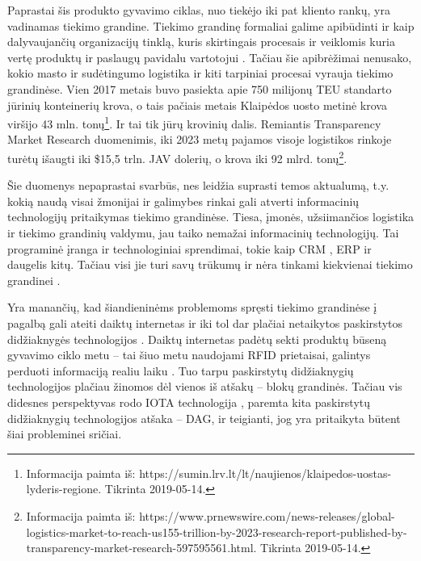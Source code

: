 Paprastai šis produkto gyvavimo ciklas, nuo tiekėjo iki pat kliento rankų, yra vadinamas tiekimo grandine. Tiekimo grandinę formaliai galime apibūdinti ir kaip dalyvaujančių organizacijų tinklą, kuris skirtingais procesais ir veiklomis kuria vertę produktų ir paslaugų pavidalu vartotojui \cite{christopher2016logistics}. Tačiau šie apibrėžimai nenusako, kokio masto ir sudėtingumo logistika ir kiti tarpiniai procesai vyrauja tiekimo grandinėse. Vien 2017 metais buvo pasiekta apie 750 milijonų TEU standarto jūrinių konteinerių krova\footnotemark[\ref{note1}], o tais pačiais metais Klaipėdos uosto metinė krova viršijo 43 mln. tonų\footnote{Informacija paimta iš: https://sumin.lrv.lt/lt/naujienos/klaipedos-uostas-lyderis-regione. Tikrinta 2019-05-14.}. Ir tai tik jūrų krovinių dalis. Remiantis Transparency Market Research duomenimis, iki 2023 metų pajamos visoje logistikos rinkoje turėtų išaugti iki \$15,5 trln. JAV dolerių, o krova iki 92 mlrd. tonų\footnote{Informacija paimta iš: https://www.prnewswire.com/news-releases/global-logistics-market-to-reach-us155-trillion-by-2023-research-report-published-by-transparency-market-research-597595561.html. Tikrinta 2019-05-14.}.

Šie duomenys nepaprastai svarbūs, nes leidžia suprasti temos aktualumą, t.y. kokią naudą visai žmonijai ir galimybes rinkai gali atverti informacinių technologijų pritaikymas tiekimo grandinėse. Tiesa, įmonės, užsiimančios logistika ir tiekimo grandinių valdymu, jau taiko nemažai informacinių technologijų. Tai programinė įranga ir technologiniai sprendimai, tokie kaip CRM \cite{bharati2015current}, ERP \cite{neubert2018collaboration} ir daugelis kitų. Tačiau visi jie turi savų trūkumų ir nėra tinkami kiekvienai tiekimo grandinei \cite{garg2018supply}.

Yra manančių, kad šiandieninėms problemoms spręsti tiekimo grandinėse į pagalbą gali ateiti daiktų internetas \cite{dweekat2017supply} ir iki tol dar plačiai netaikytos paskirstytos didžiaknygės technologijos \cite{abeyratne2016blockchain}. Daiktų internetas padėtų sekti produktų būseną gyvavimo ciklo metu – tai šiuo metu naudojami RFID prietaisai, galintys perduoti informaciją realiu laiku \cite{majeed2017internet}. Tuo tarpu paskirstytų didžiaknygių technologijos plačiau žinomos dėl vienos iš atšakų – blokų grandinės. Tačiau vis didesnes perspektyvas rodo IOTA technologija \cite{popov2016tangle}, paremta kita paskirstytų didžiaknygių technologijos atšaka – DAG, ir teigianti, jog yra pritaikyta būtent šiai probleminei sričiai. 

